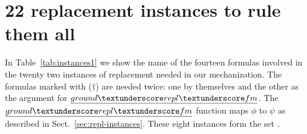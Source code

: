 \section{22 replacement instances to rule them all}
\label{sec:repl-instances-appendix}

In Table~\ref{tab:instances1} we show the name of the fourteen
formulas involved in the twenty two instances of replacement needed in
our mechanization. The formulas marked with ($\dagger$) are needed
twice: one by themselves and the other as the argument for
$\isa{ground{\uscore}repl{\uscore}fm}$. The
$\isa{ground{\uscore}repl{\uscore}fm}$ function maps $\phi$ to $\psi$
as described in Sect.~\ref{sec:repl-instances}. These eight instances form
the set .

\newcommand{\groundRepl}{\ensuremath{{}^\dagger}}
\newcommand{\replInstSet}[1]{\multicolumn{3}{@{}l}{\hspace{0.3em}{$\mathbf{\mathit{#1}}$}}}

